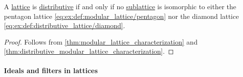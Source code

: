 \begin{corollary}\label{thm:distributive_lattice_characterization}
  A \hyperref[def:lattice]{lattice} is \hyperref[def:modular_lattice]{distributive} if and only if no \hyperref[def:lattice/submodel]{sublattice} is isomorphic to either the pentagon lattice \eqref{eq:ex:def:modular_lattice/pentagon} nor the diamond lattice \eqref{eq:ex:def:distributive_lattice/diamond}.
\end{corollary}
\begin{proof}
  Follows from \cref{thm:modular_lattice_characterization} and \cref{thm:distributive_modular_lattice_characterization}.
\end{proof}

\paragraph{Ideals and filters in lattices}

